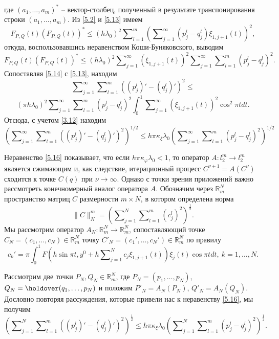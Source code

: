 \documentclass{article}
\numberwithin{equation}{section}
\theoremstyle{plain}
\theoremstyle{definition}
\begin{document}
\begin{fulltext}
\begin{equation}
\end{equation}
где $(a_1,\ldots,a_m)^*$ -- вектор-столбец, полученный в результате транспонирования строки $(a_1,\ldots,a_m)$.
Из \eqref{5.2} и \eqref{5.13}  имеем
 \begin{equation}\label{5.14}
F_{P,Q}(t)(F_{P,Q}(t))^*\le (h\lambda_0)^2 \sum\nolimits_{l=1}^m  \left(\sum\nolimits_{j=1}^\infty( p^l_j-q^l_j)\xi_{1,j+1}(t)\right)^2,
\end{equation}
откуда,  воспользовавшись неравенством Коши-Буняковского, выводим
$$
F_{P,Q}(t)(F_{P,Q}(t))^*\le(h\lambda_0)^2  \sum\nolimits_{j=1}^\infty(\xi_{1,j+1}(t))^2 \sum\nolimits_{j=1}^\infty\sum\nolimits_{l=1}^m( p^l_j-q^l_j)^2.
$$
Сопоставляя \eqref{5.14} с \eqref{5.13}, находим
$$
\sum\nolimits_{j=1}^\infty\sum\nolimits_{l=1}^m((p^l_j)'-(q^l_j)')^2\le
$$
\begin{equation}\label{5.15}
(\pi h\lambda_0)^2 \sum\nolimits_{j=1}^\infty\sum\nolimits_{l=1}^m( p^l_j-q^l_j)^2\int_{0}^1 \sum\nolimits_{j=1}^\infty(\xi_{1,j+1}(t))^2\cos^2\pi t dt.
\end{equation}
Отсюда, с учетом \eqref{3.12} находим
\begin{equation}\label{5.16}
(\sum\nolimits_{j=1}^\infty\sum\nolimits_{l=1}^m((p^l_j)'-(q^l_j)')^2)^{1/2}\le h\pi\kappa_\xi\lambda_0(\sum\nolimits_{j=1}^\infty\sum\nolimits_{l=1}^m(p^l_j-q^l_j)^2)^{1/2}
\end{equation}

Неравенство \eqref{5.16} показывает, что если $h\pi\kappa_\varphi\lambda_0<1$, то оператор  $A:l_2^m\to l_2^m$ является сжимающим и, как следствие, итерационный процесс $C^{\nu+1}=A(C^{\nu})$  сходится к точке $C(q)$ при $\nu\to\infty$. Однако с точки зрения приложений важно рассмотреть конечномерный аналог оператора $A$. Обозначим через $\mathbb{R}^N_m$ пространство матриц $C$ размерности $m\times N$, в котором определена норма
$$\|C\|_N^m=\left(\sum\nolimits_{j=1}^{N} \sum\nolimits_{l=1}^{m}(c_j^l)^2\right)^\frac12.$$
 Мы рассмотрим оператор $A_N:\mathbb{R}^N_m\to \mathbb{R}^N_m$, сопоставляющий точке\\
$C_N=(c_1,\ldots,c_{N})\in \mathbb{R}^N_m $ точку  $C'_N=(c_1',\ldots,c_{N}')\in \mathbb{R}^N_m $ по правилу
\begin{equation}\label{5.17}
c_k'=\pi\int_{0}^1 F(h\sin\pi t,y^0+ h\sum\nolimits_{j=1}^N c_j{\xi}_{1,j+1}(t))\xi_j(t) \cos\pi tdt,\ k=1,\ldots,N.
\end{equation}

 Рассмотрим две точки $P_N,Q_N\in \mathbb{R}^N_m$, где $P_N=(p_1,\ldots,p_{N})$,   $Q_N=\linebreak (q_1,\ldots,p_{N})$ и положим $P'_N=A_N(P_N)$, $Q'_N=A_N(Q_N)$. Дословно повторяя рассуждения, которые привели нас к неравенству \eqref{5.16}, мы получим
\begin{equation}\label{5.18}
\left(\sum\nolimits_{j=1}^{N}\sum\nolimits_{l=1}^m((p^l_j)'-(q^l_j)')^2\right)^\frac12\le h\pi\kappa_\xi\lambda_0 \left(\sum\nolimits_{j=1}^{N}\sum\nolimits_{l=1}^m( p^l_j-q^l_j)^2\right)^\frac12.
\end{equation}


\end{fulltext}
\end{document}
